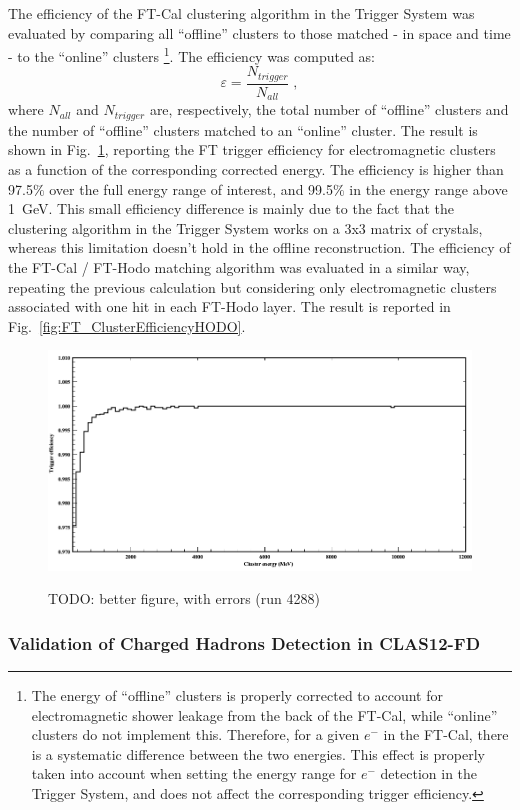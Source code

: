 The efficiency of the FT-Cal clustering algorithm in the Trigger System was evaluated by comparing all ``offline'' clusters to those matched - in space and time - to the ``online'' clusters \footnote{The energy of ``offline'' clusters is properly corrected to account for electromagnetic shower leakage from the back of the FT-Cal, while ``online'' clusters do not implement this. Therefore, for a given $e^-$ in the FT-Cal, there is a systematic difference between the two energies. This effect is properly taken into account when setting the energy range for $e^-$ detection in the Trigger System, and does not affect the corresponding trigger efficiency.}. The efficiency was computed as:
\begin{equation}
\varepsilon=\frac{N_{trigger}}{N_{all}} \; ,
\end{equation}
where $N_{all}$ and $N_{trigger}$ are, respectively, the total number of ``offline'' clusters and the number of ``offline'' clusters matched to an ``online'' cluster. The result is shown in Fig.~\ref{fig:FT_ClusterEfficiency}, reporting the FT trigger efficiency for electromagnetic clusters as a function of the corresponding corrected energy. The efficiency is higher than 97.5$\%$ over the full energy range of interest, and 99.5$\%$ in the energy range above 1~GeV. This small efficiency difference is mainly due to the fact that the clustering algorithm in the Trigger System works on a 3x3 matrix of crystals, whereas this limitation doesn't hold in the offline reconstruction.
The efficiency of the FT-Cal / FT-Hodo matching algorithm was evaluated in a similar way, repeating the previous calculation but considering only electromagnetic clusters associated with one hit in each FT-Hodo layer. The result is reported in Fig.~\ref{fig:FT_ClusterEfficiencyHODO}.

\begin{figure}[!htb]
 \centering
{\includegraphics[width=.5\textwidth]{img/FT_ClusterEfficiency.png}}
 \caption{TODO: better figure, with errors (run 4288)}
 \label{fig:FT_ClusterEfficiency}
\end{figure}


\subsubsection{Validation of Charged Hadrons Detection in CLAS12-FD}


